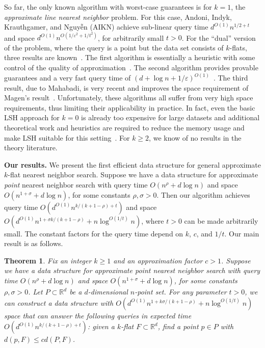 \documentclass[a4paper,11pt]{paper}
\newcommand{\mathset}[1]{\ensuremath {\mathbb {#1}}}
\newcommand{\eps}{\varepsilon}
\newcommand{\R}{\mathset{R}}
\newtheorem{theorem} {Theorem}[section]
\begin{document}
So far, the only known algorithm with
worst-case guarantees is for $k=1$, the
\emph{approximate line nearest neighbor}
problem. For this case, Andoni, Indyk,
Krauthgamer, and Nguy\~{\^{e}}n (AIKN) achieve
sub-linear query time $d^{O(1)} n^{1/2+t}$
and space $d^{O(1)} n^{O(1/\eps^2 + 1/t^2)}$,
for arbitrarily small $t > 0$. For the
``dual'' version of the problem, where
the query is a point but the data set
consists of $k$-flats, three results are
known~\cite{BasriHaZe07,Mahabadi15,Magen07}. The
first algorithm is essentially a
heuristic with some control of the
quality of
approximation~\cite{BasriHaZe07}.
The second algorithm provides
provable guarantees and a very fast
query time of
$(d+\log n + 1/\eps)^{O(1)}$~\cite{Magen07}.
The third result, due to Mahabadi, is very recent
and improves the space requirement of Magen's
result~\cite{Mahabadi15}. Unfortunately, these algorithms
all suffer from very high space requirements, thus limiting
their applicability in practice. In fact, even the basic LSH
approach for $k=0$ is already too expensive for large
datasets and additional theoretical work and heuristics are
required to reduce the memory usage and make LSH suitable
for this setting~\cite{Panigrahy06,LvJoWaChLi07}.
For $k \geq 2$, we know of no results in the
theory literature.

\noindent
\textbf{Our results.}
We present the first efficient data structure
for general approximate $k$-flat nearest
neighbor search. Suppose we have a data structure
for approximate \emph{point} nearest neighbor
search with query time $O(n^{\rho} + d\log n)$ and space
$O(n^{1+\sigma} + d\log n)$, for some constants $\rho, \sigma > 0$.
Then our algorithm achieves
query time $O(d^{O(1)}n^{k/(k + 1 - \rho) + t})$
and space
$O(d^{O(1)} n^{1+\sigma k/(k+1-\rho)} + n\log^{O(1/t)} n)$, where
$t > 0$ can be made arbitrarily small.
The constant factors for the query time depend on
$k$, $c$, and $1/t$. Our main result is as follows.

\begin{theorem}\label{thm:main}
  Fix an integer $k \geq 1$ and an approximation factor $c > 1$.
  Suppose we have a data structure
  for approximate \emph{point} nearest neighbor
  search with query time $O(n^{\rho} + d\log n)$ and space
  $O(n^{1+\sigma} + d \log n)$, for some constants $\rho, \sigma > 0$.
  Let $P \subset \R^d$ be a $d$-dimensional $n$-point set.
  For any parameter $t > 0$, we
  can construct a data structure with
  $O(d^{O(1)} n^{1+ k \sigma /(k+1 - \rho)} + n\log^{O(1/t)} n)$ space
  that can answer the following queries in
  expected time $O(d^{O(1)}n^{k/(k+1-\rho) + t})$:
  given a $k$-flat $F \subset \R^d$, find a point $p \in P$
  with $d(p, F) \leq cd(P, F)$.
\end{theorem}
\end{document}
